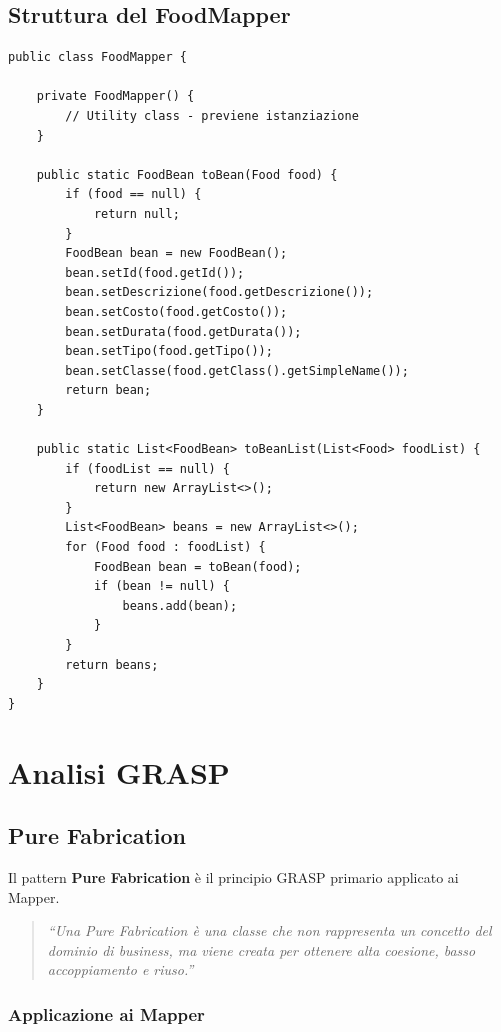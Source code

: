 \documentclass[12pt,a4paper]{article}
\begin{document}
\subsection{Struttura del FoodMapper}

\begin{lstlisting}[style=javastyle, caption={FoodMapper - Implementazione}]
public class FoodMapper {

    private FoodMapper() {
        // Utility class - previene istanziazione
    }

    public static FoodBean toBean(Food food) {
        if (food == null) {
            return null;
        }
        FoodBean bean = new FoodBean();
        bean.setId(food.getId());
        bean.setDescrizione(food.getDescrizione());
        bean.setCosto(food.getCosto());
        bean.setDurata(food.getDurata());
        bean.setTipo(food.getTipo());
        bean.setClasse(food.getClass().getSimpleName());
        return bean;
    }

    public static List<FoodBean> toBeanList(List<Food> foodList) {
        if (foodList == null) {
            return new ArrayList<>();
        }
        List<FoodBean> beans = new ArrayList<>();
        for (Food food : foodList) {
            FoodBean bean = toBean(food);
            if (bean != null) {
                beans.add(bean);
            }
        }
        return beans;
    }
}
\end{lstlisting}

\section{Analisi GRASP}

\subsection{Pure Fabrication}

Il pattern \textbf{Pure Fabrication} è il principio GRASP primario applicato ai Mapper.

\begin{quote}
\textit{``Una Pure Fabrication è una classe che non rappresenta un concetto del dominio di business, ma viene creata per ottenere alta coesione, basso accoppiamento e riuso.''}
\end{quote}

\subsubsection{Applicazione ai Mapper}
\end{document}
